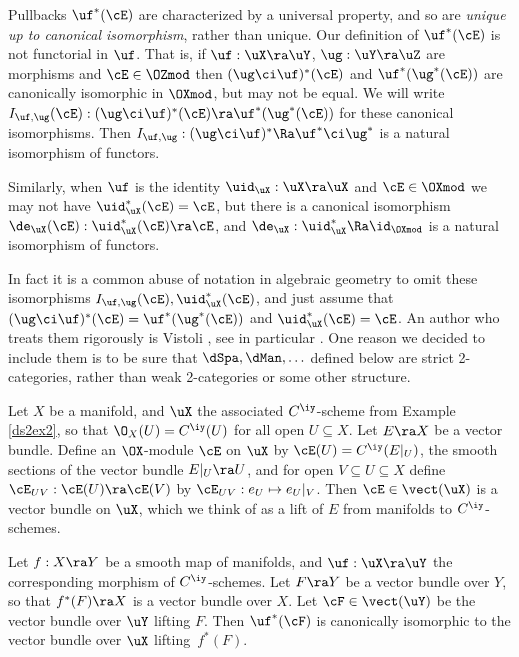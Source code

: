 \documentclass{article}
\begin{document}
\begin{rem} Pullbacks $\uf^*(\cE)$ are characterized by a universal
property, and so are {\it unique up to canonical isomorphism},
rather than unique. Our definition of $\uf^*(\cE)$ is not functorial
in $\uf$. That is, if $\uf:\uX\ra\uY$, $\ug:\uY\ra\uZ$ are morphisms
and $\cE\in\OZmod$ then $(\ug\ci\uf)^*(\cE)$ and $\uf^*(\ug^*(\cE))$
are canonically isomorphic in $\OXmod$, but may not be equal. We
will write $I_{\uf,\ug}(\cE):(\ug\ci\uf)^*(\cE)\ra\uf^*(\ug^*(\cE))$
for these canonical isomorphisms. Then $I_{\uf,\ug}:(\ug\ci\uf)^*\Ra
\uf^*\ci\ug^*$ is a natural isomorphism of functors.

Similarly, when $\uf$ is the identity $\uid_{\smash{\uX}}:\uX\ra\uX$
and $\cE\in\OXmod$ we may not have $\uid^*_{\smash{\uX}}(\cE)=\cE$,
but there is a canonical isomorphism
$\de_\uX(\cE):\uid^*_{\smash{\uX}}(\cE)\ra\cE$, and
$\de_\uX:\uid^*_{\smash{\uX}}\Ra\id_\OXmod$ is a natural isomorphism
of functors.

In fact it is a common abuse of notation in algebraic geometry to
omit these isomorphisms $I_{\uf,\ug}(\cE),
\uid^*_{\smash{\uX}}(\cE)$, and just assume that
$(\ug\ci\uf)^*(\cE)=\uf^*(\ug^*(\cE))$ and
$\uid^*_{\smash{\uX}}(\cE)=\cE$. An author who treats them
rigorously is Vistoli \cite{Vist}, see in particular
\cite[Introduction \& \S 3.2.1]{Vist}. One reason we decided to
include them is to be sure that $\dSpa,\dMan,\ldots$ defined below
are strict 2-categories, rather than weak
2-categories or some other structure.
\label{ds2rem3}
\end{rem}

\begin{ex} Let $X$ be a manifold, and $\uX$ the associated
$C^\iy$-scheme from Example \ref{ds2ex2}, so that $\O_X(U)=C^\iy(U)$
for all open $U\subseteq X$. Let $E\ra X$ be a vector bundle. Define
an $\OX$-module $\cE$ on $\uX$ by $\cE(U)=C^\iy(E\vert_U)$, the
smooth sections of the vector bundle $E\vert_U\ra U$, and for open
$V\subseteq U\subseteq X$ define $\cE_{UV}:\cE(U)\ra\cE(V)$ by
$\cE_{UV}:e_U\mapsto e_U\vert_V$. Then $\cE\in\vect(\uX)$ is a
vector bundle on $\uX$, which we think of as a lift of $E$ from
manifolds to $C^\iy$-schemes.

Let $f:X\ra Y$ be a smooth map of manifolds, and $\uf:\uX\ra\uY$ the
corresponding morphism of $C^\iy$-schemes. Let $F\ra Y$ be a vector
bundle over $Y$, so that $f^*(F)\ra X$ is a vector bundle over $X$.
Let $\cF\in\vect(\uY)$ be the vector bundle over $\uY$ lifting $F$.
Then $\uf^*(\cF)$ is canonically isomorphic to the vector bundle
over $\uX$ lifting~$f^*(F)$.
\label{ds2ex5}
\end{ex}
\end{document}
